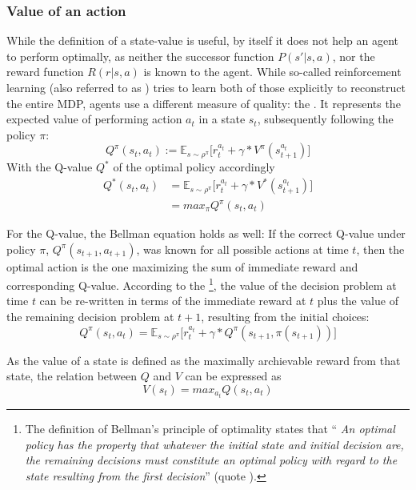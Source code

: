 \subsubsection{Value of an action}
While the definition of a state-value is useful, by itself it does not help an agent to perform optimally, as neither the successor function $P(s'|s,a)$, nor the reward function $R(r|s,a)$ is known to the agent. While so-called  reinforcement learning (also referred to as ) tries to learn both of those explicitly to reconstruct the entire MDP,  agents use a different measure of quality: the . It represents the expected value of performing action $a_t$ in a state $s_t$, subsequently following the policy $\pi$:
\begin{equation} \label{eq:1.2}
	Q^\pi(s_t,a_t) :=  \mathds{E}_{s\sim\rho^\pi} \big[ r_t^{a_t} + \gamma * V^\pi(s_{t+1}^{a_t}) \big]
\end{equation}
With the Q-value $Q^*$ of the optimal policy accordingly 
\begin{align*}
	Q^*(s_t,a_t) &=  \mathds{E}_{s\sim\rho^\pi} \big[ r_t^{a_t} + \gamma * V^*(s_{t+1}^{a_t}) \big] \\
	&= max_\pi Q^\pi(s_t,a_t)
\end{align*}

For the Q-value, the Bellman equation holds as well: If the correct Q-value under policy $\pi$, $Q^\pi(s_{t+1},a_{t+1})$, was known for all possible actions at time $t$, then the optimal action is the one maximizing the sum of immediate reward and corresponding Q-value. According to the \footnote{The definition of Bellman's principle of optimality states that ``\kern-2pt \textit{An optimal policy has the property that whatever the initial state and initial decision are, the remaining decisions must constitute an optimal policy with regard to the state resulting from the first decision}''  (quote \cite{bellman_dynamic_nodate}).}, the value of the decision problem at time $t$ can be re-written in terms of the immediate reward at $t$ plus the value of the remaining decision problem at $t+1$, resulting from the initial choices:
\begin{equation} \label{bellman}
	Q^\pi(s_t,a_t) =  \mathds{E}_{s\sim\rho^\pi} \big[r_t^{a_t} + \gamma *  Q^\pi(s_{t+1},\pi(s_{t+1}))  \big]
\end{equation}

As the value of a state is defined as the maximally archievable reward from that state, the relation between $Q$ and $V$ can be expressed as
\begin{equation} \label{eq:QandV}
V(s_t) = max_{a_t} Q(s_t, a_t)
\end{equation}

